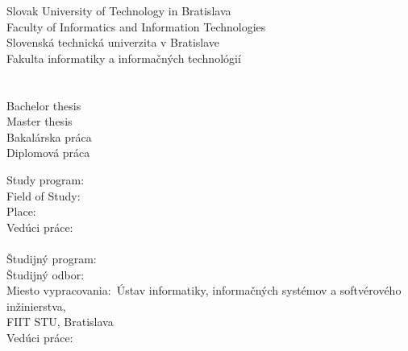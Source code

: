 \begin{center}
\thispagestyle{empty}
{
	{\Large Slovak University of Technology in Bratislava}\textbf{}\\
	{\Large Faculty of Informatics and Information Technologies}\textbf{}\\[\baselineskip]
}
{
	{\Large Slovenská technická univerzita v Bratislave}\textbf{}\\
	{\Large Fakulta informatiky a informačných technológií}\textbf{}\\[\baselineskip]
}
\vspace*{6.5cm}
{\Large \Author}\textbf{}\\[\baselineskip]
{\Large \Title}\textbf{}\\[\baselineskip]
{
	{
		{\large Bachelor thesis}\\
	}
	{
		{\large Master thesis}\\
	}
}
{
	{
		{\large Bakalárska práca}\\
	}
	{
		{\large Diplomová práca}\\
	}
}
\end{center}
\vspace*{6cm}
{
	Study program: \Program\\
	Field of Study: \Field\\
	Place: \Place\\
	Vedúci práce: \Supervisor \\\\
}
{
	Študijný program:~~~~~~~\Program\\
	Študijný odbor:~~~~~~~~~~~\Field\\
	Miesto vypracovania:~Ústav informatiky, informačných systémov a softvérového inžinierstva,\\
	\hspace*{3.8cm}FIIT STU, Bratislava\\
	Vedúci práce:~~~~~~~~~~~~~~\Supervisor \\\\
}
\Month \Year
\afterpage{\blankpage}

